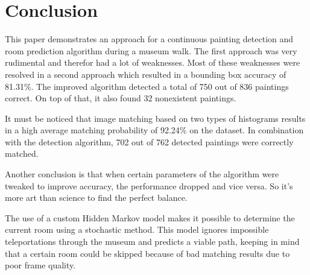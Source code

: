 \section{Conclusion}
\label{sec:conclusion}

This paper demonstrates an approach for a continuous painting detection and room prediction algorithm during a museum walk. The first approach was very rudimental and therefor had a lot of weaknesses. Most of these weaknesses were resolved in a second approach which resulted in a bounding box accuracy of 81.31\%. The improved algorithm detected a total of 750 out of 836 paintings correct. On top of that, it also found 32 nonexistent paintings.

It must be noticed that image matching based on two types of histograms results in a high average matching probability of 92.24\% on the dataset. In combination with the detection algorithm, 702 out of 762 detected paintings were correctly matched.

Another conclusion is that when certain parameters of the algorithm were tweaked to improve accuracy, the performance dropped and vice versa. So it's more art than science to find the perfect balance.

The use of a custom Hidden Markov model makes it possible to determine the current room using a stochastic method. This model ignores impossible teleportations through the museum and predicts a viable path, keeping in mind that a certain room could be skipped because of bad matching results due to poor frame quality.

